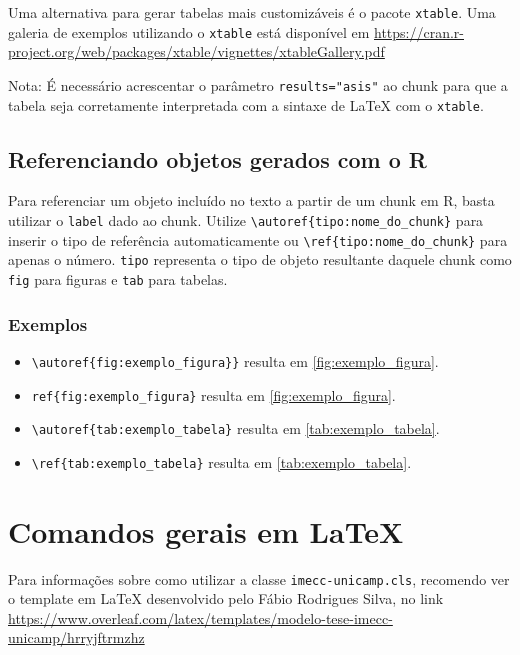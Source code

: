 \documentclass[
	oldfontcommands,
	sumario=abnt-6027-2012,
	12pt,
	openright,
	oneside,
	a4paper,
	english,
	english
	]{imecc-unicamp}
\begin{document}
Uma alternativa para gerar tabelas mais customizáveis é o pacote
\texttt{xtable}. Uma galeria de exemplos utilizando o \texttt{xtable}
está disponível em
\url{https://cran.r-project.org/web/packages/xtable/vignettes/xtableGallery.pdf}

Nota: É necessário acrescentar o parâmetro \texttt{results="asis"} ao
chunk para que a tabela seja corretamente interpretada com a sintaxe de
LaTeX com o \texttt{xtable}.

\section{Referenciando objetos gerados com o R}

Para referenciar um objeto incluído no texto a partir de um chunk em R,
basta utilizar o \texttt{label} dado ao chunk. Utilize
\texttt{\textbackslash{}autoref\{tipo:nome\_do\_chunk\}} para inserir o
tipo de referência automaticamente ou
\texttt{\textbackslash{}ref\{tipo:nome\_do\_chunk\}} para apenas o
número. \texttt{tipo} representa o tipo de objeto resultante daquele
chunk como \texttt{fig} para figuras e \texttt{tab} para tabelas.

\subsection{Exemplos}

\begin{itemize}
\tightlist
\item
  \texttt{\textbackslash{}autoref\{fig:exemplo\_figura\}\}} resulta em
  \autoref{fig:exemplo_figura}.
\item
  \texttt{ref\{fig:exemplo\_figura\}} resulta em
  \ref{fig:exemplo_figura}.
\item
  \texttt{\textbackslash{}autoref\{tab:exemplo\_tabela\}} resulta em
  \autoref{tab:exemplo_tabela}.
\item
  \texttt{\textbackslash{}ref\{tab:exemplo\_tabela\}} resulta em
  \ref{tab:exemplo_tabela}.
\end{itemize}

\chapter{Comandos gerais em LaTeX}

Para informações sobre como utilizar a classe
\texttt{imecc-unicamp.cls}, recomendo ver o template em LaTeX
desenvolvido pelo Fábio Rodrigues Silva, no link
\url{https://www.overleaf.com/latex/templates/modelo-tese-imecc-unicamp/hrryjftrmzhz}
\end{document}
